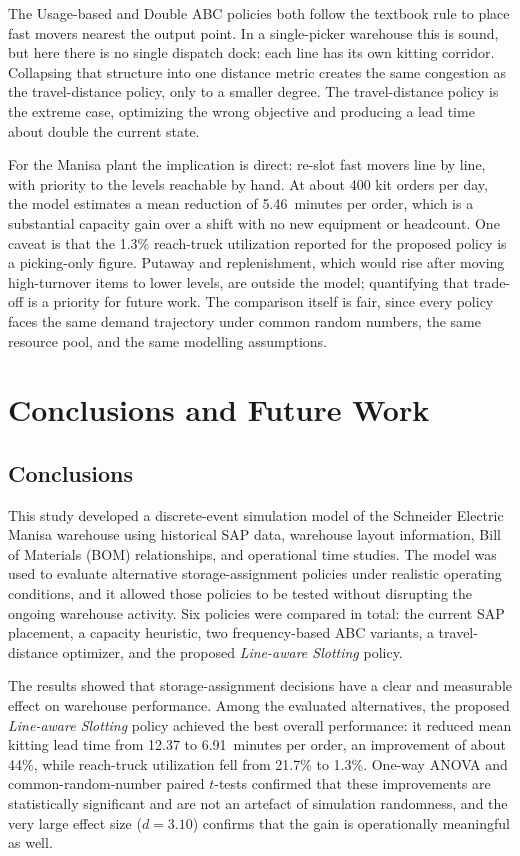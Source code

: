 \documentclass[12pt,a4paper]{article}
\newcommand{\policy}[1]{\textit{#1}}
\begin{document}
The Usage-based and Double ABC policies both follow the textbook rule to place
fast movers nearest the output point. In a single-picker warehouse this is
sound, but here there is no single dispatch dock: each line has its own
kitting corridor. Collapsing that structure into one distance metric creates
the same congestion as the travel-distance policy, only to a smaller degree.
The travel-distance policy is the extreme case, optimizing the wrong objective
and producing a lead time about double the current state.

For the Manisa plant the implication is direct: re-slot fast movers line by
line, with priority to the levels reachable by hand. At about 400 kit orders
per day, the model estimates a mean reduction of 5.46~minutes per order, which
is a substantial capacity gain over a shift with no new equipment or
headcount. One caveat is that the 1.3\% reach-truck utilization reported for
the proposed policy is a picking-only figure. Putaway and replenishment, which
would rise after moving high-turnover items to lower levels, are outside the
model; quantifying that trade-off is a priority for future work. The
comparison itself is fair, since every policy faces the same demand
trajectory under common random numbers, the same resource pool, and the same
modelling assumptions.

\section{Conclusions and Future Work}
\subsection{Conclusions}
This study developed a discrete-event simulation model of the Schneider
Electric Manisa warehouse using historical SAP data, warehouse layout
information, Bill of Materials (BOM) relationships, and operational time
studies. The model was used to evaluate alternative storage-assignment
policies under realistic operating conditions, and it allowed those policies
to be tested without disrupting the ongoing warehouse activity. Six policies
were compared in total: the current SAP placement, a capacity heuristic, two
frequency-based ABC variants, a travel-distance optimizer, and the proposed
\policy{Line-aware Slotting} policy.

The results showed that storage-assignment decisions have a clear and
measurable effect on warehouse performance. Among the evaluated alternatives,
the proposed \policy{Line-aware Slotting} policy achieved the best overall
performance: it reduced mean kitting lead time from 12.37 to 6.91~minutes per
order, an improvement of about 44\%, while reach-truck utilization fell from
21.7\% to 1.3\%. One-way ANOVA and common-random-number paired $t$-tests
confirmed that these improvements are statistically significant and are not an
artefact of simulation randomness, and the very large effect size
($d=3.10$) confirms that the gain is operationally meaningful as well.
\end{document}
